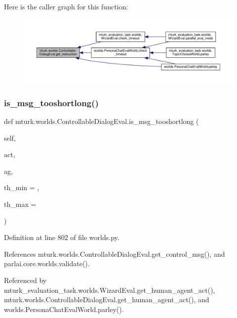Here is the caller graph for this function\+:
\nopagebreak
\begin{figure}[H]
\begin{center}
\leavevmode
\includegraphics[width=350pt]{classmturk_1_1worlds_1_1ControllableDialogEval_a8792ad92033ef69bb203d7a3574f4343_icgraph}
\end{center}
\end{figure}
\mbox{\label{classmturk_1_1worlds_1_1ControllableDialogEval_a549992c78140c745d43874d073eb90c1}} 
\subsubsection{\texorpdfstring{is\+\_\+msg\+\_\+tooshortlong()}{is\_msg\_tooshortlong()}}
{\footnotesize\ttfamily def mturk.\+worlds.\+Controllable\+Dialog\+Eval.\+is\+\_\+msg\+\_\+tooshortlong (\begin{DoxyParamCaption}\item[{}]{self,  }\item[{}]{act,  }\item[{}]{ag,  }\item[{}]{th\+\_\+min = {},  }\item[{}]{th\+\_\+max = {} }\end{DoxyParamCaption})}



Definition at line 802 of file worlds.\+py.



References mturk.\+worlds.\+Controllable\+Dialog\+Eval.\+get\+\_\+control\+\_\+msg(), and parlai.\+core.\+worlds.\+validate().



Referenced by mturk\+\_\+evaluation\+\_\+task.\+worlds.\+Wizard\+Eval.\+get\+\_\+human\+\_\+agent\+\_\+act(), mturk.\+worlds.\+Controllable\+Dialog\+Eval.\+get\+\_\+human\+\_\+agent\+\_\+act(), and worlds.\+Persona\+Chat\+Eval\+World.\+parley().

